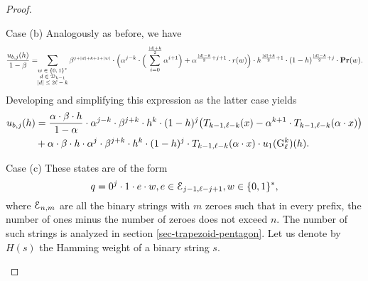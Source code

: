 \begin{proof}
\begin{subsubsection}{Case (b)}
Analogously as before, we have
$$
 \scriptsize   \frac{u_{b,j}(h)}{1-\beta} = 
\scriptsize \!\!\!\!\!\sum_{
 \begin{array}{c}
 w\in \bstring\\
  d\in \Dyck_{k-1}\\
  |d| \leq 2\ell-k
  \end{array}
  }\!\!\!\beta^{\scriptscriptstyle j+|d|+k+1+|w|}\cdot \bigg(\alpha^{j-k}\cdot \bigg(\sum_{i=0}^{\frac{|d|+k}{2}}\alpha^{i+1}\bigg) + \alpha^{\frac{|d|-k}{2}+j+1} \cdot r(w)\bigg) \cdot h^{\frac{|d|+k}{2}+1}\cdot (1-h)^{\frac{|d|-k}{2}+j}\cdot \pr(w).
$$
Developing and simplifying this expression as the latter case yields
\begin{align*}
u_{b,j}(h) &= \frac{\alpha\cdot\beta\cdot h}{1-\alpha}\cdot \alpha^{j-k}\cdot \beta^{j+k}\cdot h^{k}\cdot (1-h)^{j}\big(T_{k-1,\ell-k}(x)-\alpha^{k+1}\cdot T_{k-1,\ell-k}(\alpha\cdot x)\big) \\
&+ \alpha\cdot\beta\cdot h\cdot \alpha^j\cdot\beta^{j+k}\cdot h^{k}\cdot(1-h)^{j}\cdot T_{k-1,\ell-k}(\alpha\cdot x)\cdot  u_1({\rm {G}}^k_\ell)(h).
\end{align*}

\end{subsubsection}


\begin{subsubsection}{Case (c)}
These states are of the form 
$$q = 0^j\cdot 1\cdot e\cdot w, e\in \mathcal{E}_{j-1,\ell-j+1}, w\in \{0,1\}^\ast,$$ 
where $\mathcal{E}_{n,m}$ are all the binary strings with $m$ zeroes such that in every prefix, the number of ones minus the number of zeroes does not exceed $n$. The number of such strings is analyzed in section \ref{sec-trapezoid-pentagon}. Let us denote by $H(s)$ the Hamming weight of a binary string $s$. 

\begin{figure}[ht!]
\end{figure}
\end{subsubsection}
\end{proof}
